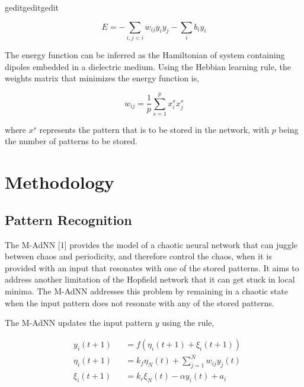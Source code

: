 geditgeditgedit\documentclass[12pt, letterpaper]{article}
\begin{document}
$$
E = -\sum_{i,j < i} w_{ij}y_i y_j - \sum_{i} b_i y_i
$$

The energy function can be inferred as the Hamiltonian of system containing dipoles embedded in a dielectric medium. Using the Hebbian learning rule, the weights matrix that minimizes the energy function is,

$$
w_{ij} = \frac{1}{p} \sum_{s=1}^p x_i^s x_j^s
$$

where $x^s$ represents the pattern that is to be stored in the network, with $p$ being the number of patterns to be stored.

\section*{Methodology}

\subsection*{Pattern Recognition}

The M-AdNN [1] provides the model of a chaotic neural network that can juggle between chaos and periodicity, and therefore control the chaos, when it is provided with an input that resonates with one of the stored patterns. It aims to address another limitation of the Hopfield network that it can get stuck in local minima. The M-AdNN addresses this problem by remaining in a chaotic state when the input pattern does not resonate with any of the stored patterns.

The M-AdNN updates the input pattern $y$ using the rule,

$$
\begin{aligned}
& y_i(t+1) &&= f(\eta_i(t+1) + \xi_i(t+1))\\
& \eta_i(t+1) &&= k_f \eta_N(t) + \sum_{j = 1}^N w_{ij} y_j(t)\\
& \xi_i(t+1) &&= k_r \xi_N(t) - \alpha y_i(t) + a_i
\end{aligned}
$$
\end{document}
